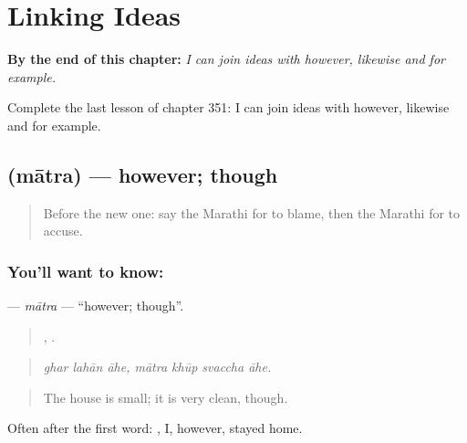 
\chapter{Linking Ideas}
\label{ch:mr-linking-ideas}

\begin{chapteropening}
\textbf{By the end of this chapter:} \emph{I can join ideas with however, likewise and for example.}

Complete the last lesson of chapter 351: I can join ideas with however, likewise and for example.
\end{chapteropening}

\section[\texorpdfstring{\mr{मात्र} (mātra)}{मात्र (mātra)}]{ (mātra) — however; though}

\label{lesson:MR-C351-matra}



\begin{quote}
Before the new one: say the Marathi for to blame, then the Marathi for to accuse.
\end{quote}

\subsection*{You'll want to know: }
\textbf{} — \emph{mātra} — \textquotedblleft{}however; though\textquotedblright{}.

\begin{quote}
  ,    .
\end{quote}

\begin{quote}
\emph{ghar lahān āhe, mātra khūp svaccha āhe.}
\end{quote}

\begin{quote}
The house is small; it is very clean, though.
\end{quote}

Often after the first word:    , I, however, stayed home.

